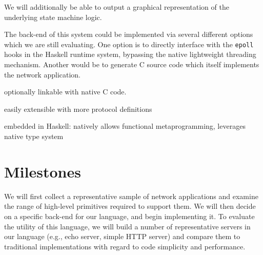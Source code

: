 \documentclass{article}
\renewcommand{\t}{\texttt}
\begin{document}
We will additionally be able to output a graphical representation of the
underlying state machine logic.

The back-end of this system could be implemented via several different options
which we are still evaluating. One option is to directly interface with the
\t{epoll} hooks in the Haskell runtime system, bypassing the native lightweight
threading mechanism. Another would be to generate C source code which itself
implements the network application.

optionally linkable with native C code.

easily extensible with more protocol definitions

embedded in Haskell: natively allows functional metaprogramming,
leverages native type system

\section{Milestones}

We will first collect a representative sample of network applications and
examine the range of high-level primitives required to support them. We will
then decide on a specific back-end for our language, and begin implementing it.
To evaluate the utility of this language, we will build a number of
representative servers in our language (e.g., echo server, simple HTTP server)
and compare them to traditional implementations with regard to code simplicity
and performance.

{}

\end{document}
